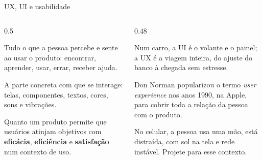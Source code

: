 \documentclass[aspectratio=169,10pt]{beamer}
\begin{document}
\begin{frame}{UX, UI e usabilidade}
  \begin{columns}[T]
    \begin{column}{0.5\textwidth}
      \begin{definicao}
        Tudo o que a pessoa percebe e sente ao usar o produto: encontrar, aprender, usar, errar, receber ajuda.
      \end{definicao}
      \begin{definicao}
        A parte concreta com que se interage: telas, componentes, textos, cores, sons e vibrações.
      \end{definicao}
      \begin{definicao}
        Quanto um produto permite que usuários atinjam objetivos com \textbf{eficácia}, \textbf{eficiência} e \textbf{satisfação} num contexto de uso.
      \end{definicao}
    \end{column}
    \begin{column}{0.48\textwidth}
      \begin{analogia}
        Num carro, a UI é o volante e o painel; a UX é a viagem inteira, do ajuste do banco à chegada sem estresse.
      \end{analogia}
      \begin{historia}
        Don Norman popularizou o termo \emph{user experience} nos anos 1990, na Apple, para cobrir toda a relação da pessoa com o produto.
      \end{historia}
      \begin{atencao}
        No celular, a pessoa usa uma mão, está distraída, com sol na tela e rede instável. Projete para esse contexto.
      \end{atencao}
    \end{column}
  \end{columns}
\end{frame}
\end{document}
